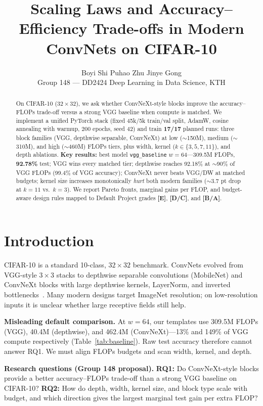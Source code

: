 \documentclass{article}
\title{Scaling Laws and Accuracy--Efficiency Trade-offs in Modern ConvNets on CIFAR-10}
\author{%
  Boyi Shi \qquad Puhao Zhu \qquad Jinye Gong \\
  Group 148 --- DD2424 Deep Learning in Data Science, KTH \\
}
\newcommand{\grade}[1]{\textbf{\textcolor{blue!70!black}{[#1]}}}
\begin{document}
\maketitle

\begin{abstract}
  On CIFAR-10 ($32{\times}32$), we ask whether ConvNeXt-style blocks improve the accuracy--FLOPs trade-off versus a strong VGG baseline when compute is matched.
  We implement a unified PyTorch stack (fixed 45k/5k train/val split, AdamW, cosine annealing with warmup, 200 epochs, seed 42) and train \textbf{17/17} planned runs: three block families (VGG, depthwise separable, ConvNeXt) at low ($\sim$150M), medium ($\sim$310M), and high ($\sim$460M) FLOPs tiers, plus width, kernel ($k{\in}\{3,5,7,11\}$), and depth ablations.
  \textbf{Key results:} best model \texttt{vgg\_baseline} $w{=}64$---309.5M FLOPs, \textbf{92.78\%} test; VGG wins every matched tier; depthwise reaches 92.18\% at $\sim$90\% of VGG FLOPs (99.4\% of VGG accuracy); ConvNeXt never beats VGG/DW at matched budgets; kernel size increases monotonically \emph{hurt} both modern families ($\sim$3.7 pt drop at $k{=}11$ vs.\ $k{=}3$).
  We report Pareto fronts, marginal gains per FLOP, and budget-aware design rules mapped to Default Project grades \grade{E}, \grade{D/C}, and \grade{B/A}.
\end{abstract}

\section{Introduction}

CIFAR-10 is a standard 10-class, $32{\times}32$ benchmark. ConvNets evolved from VGG-style $3{\times}3$ stacks to depthwise separable convolutions (MobileNet) and ConvNeXt blocks with large depthwise kernels, LayerNorm, and inverted bottlenecks~\cite{liu2022convnext}. Many modern designs target ImageNet resolution; on low-resolution inputs it is unclear whether large receptive fields still help.

\textbf{Misleading default comparison.} At $w{=}64$, our templates use 309.5M FLOPs (VGG), 40.4M (depthwise), and 462.4M (ConvNeXt)---13\% and 149\% of VGG compute respectively (Table~\ref{tab:baseline}). Raw test accuracy therefore cannot answer RQ1. We must align FLOPs budgets and scan width, kernel, and depth.

\textbf{Research questions (Group 148 proposal).}
\textbf{RQ1:} Do ConvNeXt-style blocks provide a better accuracy--FLOPs trade-off than a strong VGG baseline on CIFAR-10?
\textbf{RQ2:} How do depth, width, kernel size, and block type scale with budget, and which direction gives the largest marginal test gain per extra FLOP?
\end{document}
